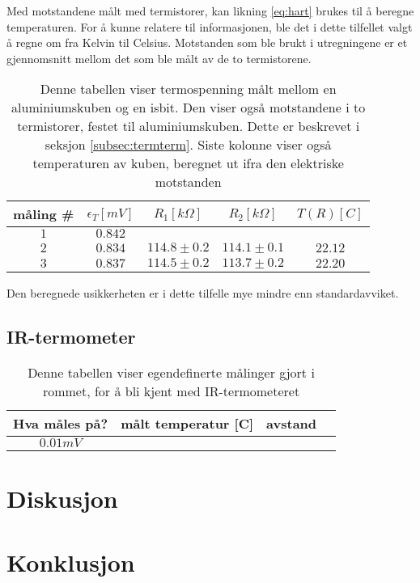 \documentclass[a4paper,norsk,12pt,oneside]{article}
\begin{document}
Med motstandene målt med termistorer, kan likning \ref{eq:hart} brukes til å beregne 
temperaturen. For å kunne relatere til informasjonen, ble det i dette tilfellet valgt å 
regne om fra Kelvin til Celsius. Motstanden som ble brukt i utregningene er et  
gjennomsnitt mellom det som ble målt av de to termistorene. 

\begin{table}[H]  
  \begin{center}
      \caption{Denne tabellen viser termospenning målt mellom en aluminiumskuben og en 
          isbit. Den viser også motstandene i to termistorer, festet til aluminiumskuben. 
          Dette er 
          beskrevet i seksjon \ref{subsec:termterm}. Siste kolonne viser også temperaturen 
          av kuben, beregnet ut ifra den elektriske motstanden \label{tab:kloss}}
  \begin{tabular}{|c|c|c|c|c|} \hline
      \textbf{måling \#} & \textbf{\(\epsilon_T [mV]\)} & \textbf{\(R_1 [k\Omega]\)} & 
      \textbf{\(R_2 [k\Omega]\)} & \textbf{\(T(R) [C]\)} \\ \hline
  \(1\) & \( 0.842 \) & & & \\ \hline
  \(2\) & \( 0.834 \) & \(114.8 \pm 0.2\) & \(114.1 \pm 0.1\) & \(22.12\) \\ \hline
  \(3\) & \( 0.837 \) & \(114.5 \pm 0.2\) & \(113.7 \pm 0.2\) & \(22.20\)\\ \hline 
  \end{tabular}
  \end{center}
\end{table} 

Den beregnede usikkerheten er i dette tilfelle mye mindre enn standardavviket. 

\subsection{IR-termometer}



\begin{table}[H]  
  \begin{center}
      \caption{Denne tabellen viser egendefinerte målinger gjort i rommet, for å bli kjent 
          med IR-termometeret\label{tab:ir1}}
  \begin{tabular}{|c|c|c|c|} \hline
      \textbf{Hva måles på?} & \textbf{målt temperatur [C]} & \textbf{avstand} \\ \hline
  \(0.01 mV\)\\ \hline
  \end{tabular}
  \end{center}
\end{table}       


\section{Diskusjon}

\section{Konklusjon}


\end{document}
